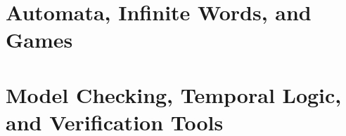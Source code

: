 \documentclass[11pt, oneside]{book}
\begin{document}
\maketitlepage
\tableofcontents

\part{Automata, Infinite Words, and Games}








\part{Model Checking, Temporal Logic, and Verification Tools}










\end{document}
